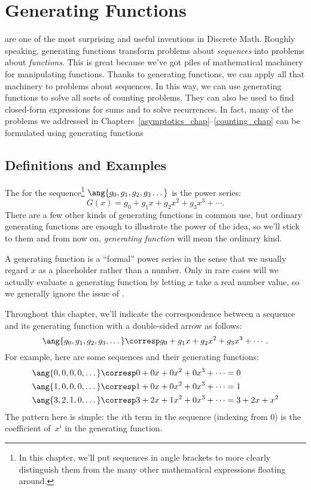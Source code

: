 \chapter{Generating Functions}\label{generating_function_chap}

 are one of the most surprising and useful
inventions in Discrete Math.  Roughly speaking, generating functions
transform problems about \emph{sequences} into problems about
\emph{functions}.  This is great because we've got piles of mathematical
machinery for manipulating functions.  Thanks to generating functions, we
can apply all that machinery to problems about sequences.  In this way, we
can use generating functions to solve all sorts of counting problems.
They can also be used to find closed-form expressions for sums and to
solve recurrences.  In fact, many of the problems we addressed in
Chapters~\hbox{\ref{asymptotics_chap}--\ref{counting_chap}} can be
formulated using generating functions\cutoff

\section{Definitions and Examples}

The  for the sequence\footnote{In
  this chapter, we'll put sequences in angle brackets to more clearly
  distinguish them from the many other mathematical expressions
  floating around.} $\ang{g_0, g_1, g_2, g_3 \dots}$ is the power
series:
\[
G(x) = g_0 + g_1 x + g_2 x^2 + g_3 x^3 + \cdots.
\]
There are a few other kinds of generating functions in common use, but
ordinary generating functions are enough to illustrate the power of
the idea, so we'll stick to them and from now on, \emph{generating
  function} will mean the ordinary kind.

A generating function is a ``formal'' power series in the sense that we
usually regard $x$ as a placeholder rather than a number.  Only in rare
cases will we actually evaluate a generating function by letting $x$ take
a real number value, so we generally ignore the issue of .

Throughout this chapter, we'll indicate the correspondence between a
sequence and its generating function with a double-sided arrow as
follows:
%
\[
\ang{g_0, g_1, g_2, g_3, \dots}
    \corresp g_0 + g_1 x + g_2 x^2 + g_3 x^3 + \cdots.
\]
%
For example, here are some sequences and their generating functions:
%
\begin{align*}
\ang{0, 0, 0, 0, \dots}
    & \corresp 0 + 0 x + 0 x^2 + 0 x^3 + \cdots = 0 \\
\ang{1, 0, 0, 0, \dots}
    & \corresp 1 + 0 x + 0 x^2 + 0 x^3 + \cdots = 1 \\
\ang{3, 2, 1, 0, \dots}
    & \corresp 3 + 2 x + 1 x^2 + 0 x^3 + \cdots = 3 + 2 x + x^2
\end{align*}
%
The pattern here is simple: the $i$th term in the sequence (indexing
from 0) is the coefficient of~$x^i$ in the generating function.

